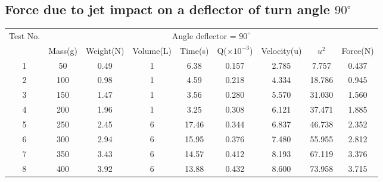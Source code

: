 \documentclass[12pt,a4paper]{article}
\begin{document}
\subsection{Force due to jet impact on a deflector of turn angle $90^{\circ}$}
\begin{table}[ht]


\begin{flushleft}
\begin{tabular}{ |c|c|c|c|c|c|c|c|c| } 
\hline

 \multirow{2}{*}{Test No.} & \multicolumn{8}{c|}{Angle deflector = $90^{\circ}$ } \\ \cline{2-9}
                           & Mass(g)& Weight(N) & Volume(L) & Time(s) & Q($\times10 ^{-3}$) & Velocity(u) & $u^2$ & Force(N)\\ \hline
 1                         & 50 & 0.49 & 1 & 6.38 & 0.157 & 2.785 & 7.757 & 0.437  \\ \hline
 2                         & 100 & 0.98 & 1 & 4.59 & 0.218 & 4.334 & 18.786 & 0.945 \\ \hline
 3                         & 150 & 1.47 & 1 & 3.56 & 0.280 & 5.570 & 31.030 & 1.560\\ \hline
 4                         & 200 & 1.96 & 1 & 3.25 & 0.308 & 6.121 & 37.471 & 1.885\\ \hline
 5                         & 250 & 2.45 & 6 & 17.46 & 0.344 & 6.837 & 46.738 & 2.352 \\ \hline
 6                         & 300 & 2.94 & 6 & 15.95 & 0.376 & 7.480 & 55.955 & 2.812 \\ \hline
 7                         & 350 & 3.43 & 6 & 14.57 & 0.412 & 8.193 & 67.119 & 3.376 \\ \hline
 8                         & 400 & 3.92 & 6 & 13.88 & 0.432 & 8.600 & 73.958 & 3.715 \\ \hline
\end{tabular}
\end{flushleft}
\end{table}
\end{document}
